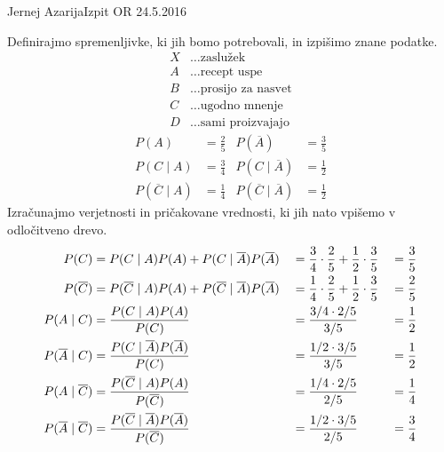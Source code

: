 \begin{naloga}{Jernej Azarija}{Izpit OR 24.5.2016}
\begin{odgovor}
Definirajmo spremenljivke, ki jih bomo potrebovali,
in izpišimo znane podatke.
\begin{align*}
X &\dots \text{zaslužek}\\
A &\dots \text{recept uspe}\\
B &\dots \text{prosijo za nasvet}\\
C &\dots \text{ugodno mnenje}\\
D &\dots \text{sami proizvajajo}
\end{align*}
\begin{align*}
P(A) &= \frac{2}{5} &
P(\overline{A}) &= \frac{3}{5} \\
P(C \mid A)& = \frac{3}{4} &
P(C \mid \overline{A}) &= \frac{1}{2} \\
P(\overline{C} \mid A) &= \frac{1}{4} &
P(\overline{C} \mid \overline{A}) &= \frac{1}{2}
\end{align*}
Izračunajmo verjetnosti in pričakovane vrednosti,
ki jih nato vpišemo v od\-lo\-čit\-ve\-no drevo.
\begin{alignat*}{3}
P(C) &= P(C \mid A) P(A) + P(C \mid \overline{A}) P(\overline{A})
&&= \frac{3}{4}\cdot \frac{2}{5} + \frac{1}{2}\cdot \frac{3}{5}
&&= \frac{3}{5} \\
P(\overline{C}) &= P(\overline{C} \mid A) P(A) + P(\overline{C} \mid \overline{A}) P(\overline{A})
&&= \frac{1}{4}\cdot \frac{2}{5} + \frac{1}{2}\cdot \frac{3}{5}
&&= \frac{2}{5} \\
P(A \mid C) &= \frac{P(C \mid A) P(A)}{P(C)}
&&= {3/4 \cdot 2/5 \over 3/5} &&= \frac{1}{2} \\
P(\overline{A} \mid C) &= \frac{P(C \mid \overline{A})P(\overline{A})}{P(C)}
&&= {1/2 \cdot 3/5 \over 3/5} &&= \frac{1}{2} \\
P(A \mid \overline{C}) &= \frac{P(\overline{C} \mid A) P(A)}{P(\overline{C})}
&&= {1/4 \cdot 2/5 \over 2/5} &&= \frac{1}{4} \\
P(\overline{A} \mid \overline{C}) &= \frac{P(\overline{C} \mid \overline{A})P(\overline{A})}{P(\overline{C})}
&&= {1/2 \cdot 3/5 \over 2/5} &&= \frac{3}{4}
\end{alignat*}


\end{odgovor}
\end{naloga}
